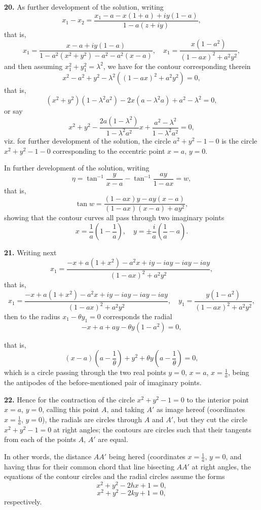 \documentclass[11pt,a4paper]{article}
\begin{document}
\textbf{20.} As further development of the solution, writing
\[
x_1 - x_2 = \frac{x_1 - a - x(1 + a) + i y(1 - a)}{1 - a(z + iy)},
\]
that is,
\[
x_1 = \frac{x - a + iy(1 - a)}{1 - a^2(x^2 + y^2) - a^2 - a^2(x - a)}, \quad x_1 = \frac{x(1 - a^2)}{(1 - ax)^2 + a^2 y^2},
\]
and then assuming $x_1^2 + y_1^2 = \lambda^2$, we have for the contour corresponding therein
\[
x^2 - a^2 + y^2 - \lambda^2((1 - a x)^2 + a^2 y^2) = 0,
\]
that is,
\[
(x^2 + y^2) (1 - \lambda^2 a^2) - 2x(a - \lambda^2 a) + a^2 - \lambda^2 = 0,
\]
or say
\[
x^2 + y^2 - \frac{2a(1 - \lambda^2)}{1 - \lambda^2 a^2} x + \frac{a^2 - \lambda^2}{1 - \lambda^2 a^2} = 0,
\]
viz. for further development of the solution, the circle $a^2 + y^2 - 1 - 0$ is the circle $x^2 + y^2 - 1 - 0$ corresponding to the eccentric point $x = a$, $y = 0$.

In further development of the solution, writing
\[
\eta = \tan^{-1}\frac{y}{x - a} - \tan^{-1} \frac{ay}{1 - ax} = w,
\]
that is,
\[
\tan w = \frac{(1 - a x) y - a y (x - a)}{(1 - ax)(x - a) + a y^2},
\]
showing that the contour curves all pass through two imaginary points
\[
x = \frac{1}{a}\left(1 - \frac{1}{a}\right), \quad y = \pm\frac{i}{a}\left(\frac{1}{a} - a\right).
\]

\textbf{21.} Writing next
\[
x_1 = \frac{- x + a(1 + x^2) - a^2 x + i y - i a y - i a y - i a y}{(1 - ax)^2 + a^2 y^2},
\]
that is,
\[
x_1 = \frac{- x + a(1 + x^2) - a^2 x + i y - i a y - i a y - i a y}{(1 - ax)^2 + a^2 y^2}, \quad y_1 = \frac{y(1 - a^2)}{(1 - ax)^2 + a^2 y^2},
\]
then to the radius $x_1 - \theta y_1 = 0$ corresponds the radial
\[
- x + a + a y - \theta y (1 - a^2) = 0,
\]

that is,
\[
(x - a)\left(a - \frac{1}{\theta}\right) + y^2 + \theta y\left(a - \frac{1}{\theta}\right) = 0,
\]
which is a circle passing through the two real points $y = 0$, $x = a$, $x = \frac{1}{a}$, being the antipodes of the before-mentioned pair of imaginary points.

\textbf{22.} Hence for the contraction of the circle $x^2 + y^2 - 1 = 0$ to the interior point $x = a$, $y = 0$, calling this point $A$, and taking $A'$ as image hereof (coordinates $x = \frac{1}{a}$, $y = 0$), the radials are circles through $A$ and $A'$, but they cut the circle $x^2 + y^2 - 1 = 0$ at right angles; the contours are circles such that their tangents from each of the points $A$, $A'$ are equal.

In other words, the distance $AA'$ being hered (coordinates $x = \frac{1}{a}$, $y = 0$, and having thus for their common chord that line bisecting $AA'$ at right angles, the equations of the contour circles and the radial circles assume the forms
\[
x^2 + y^2 - 2hx + 1 = 0,
\]
\[
x^2 + y^2 - 2ky + 1 = 0,
\]
respectively.
\end{document}
